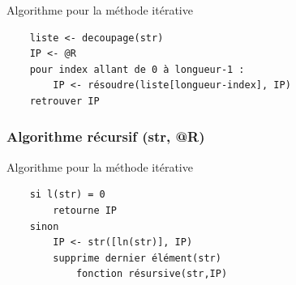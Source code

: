 \documentclass[12pt, a4paper]{article}
\begin{document}
    \begin{listing}[H]
        \caption{Algorithme pour la méthode itérative}
        \label{lst:ite}
        \begin{verbatim}
    liste <- decoupage(str)
    IP <- @R 
    pour index allant de 0 à longueur-1 :
        IP <- résoudre(liste[longueur-index], IP)
    retrouver IP
        \end{verbatim}
    \end{listing}

    \subsubsection{Algorithme récursif (str, @R)}

    \begin{listing}[H]
        \caption{Algorithme pour la méthode itérative}
        \label{lst:recu}
        \begin{verbatim}
    si l(str) = 0
        retourne IP
    sinon
        IP <- str([ln(str)], IP)
        supprime dernier élément(str)
            fonction résursive(str,IP)
        \end{verbatim}
    \end{listing}
\end{document}
